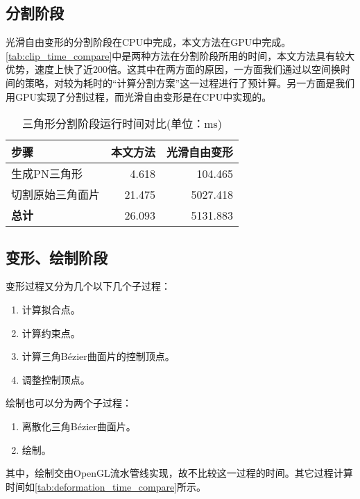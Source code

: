 \subsection{分割阶段}
光滑自由变形的分割阶段在CPU中完成，本文方法在GPU中完成。\autoref{tab:clip_time_compare}中是两种方法在分割阶段所用的时间，本文方法具有较大优势，速度上快了近200倍。这其中在两方面的原因，一方面我们通过以空间换时间的策略，对较为耗时的“计算分割方案”这一过程进行了预计算。另一方面是我们用GPU实现了分割过程，而光滑自由变形是在CPU中实现的。

\begin{table}[htbp]
    \centering
    \begin{tabular}{lrr}
    \toprule
    \textbf{步骤}   & \textbf{本文方法} & \textbf{光滑自由变形\cite{Cui15}} \\
    \midrule
    生成PN三角形    & 4.618             & 104.465                           \\
    切割原始三角面片& 21.475            & 5027.418                          \\
    \midrule
    \textbf{总计}   & 26.093            & 5131.883                          \\
    \bottomrule
    \end{tabular}
    \caption{三角形分割阶段运行时间对比(单位：ms)}\label{tab:clip_time_compare}
\end{table}

\subsection{变形、绘制阶段}
变形过程又分为几个以下几个子过程：
\begin{enumerate}
    \item 计算拟合点。
    \item 计算约束点。
    \item 计算三角Bézier曲面片的控制顶点。
    \item 调整控制顶点。
\end{enumerate}

绘制也可以分为两个子过程：
\begin{enumerate}
    \item 离散化三角Bézier曲面片。
    \item 绘制。
\end{enumerate}

其中，绘制交由OpenGL流水管线实现，故不比较这一过程的时间。其它过程计算时间如\autoref{tab:deformation_time_compare}所示。

